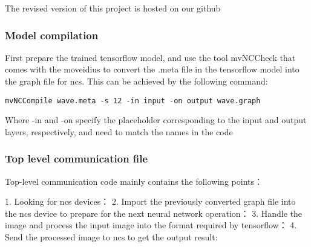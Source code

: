 The revised version of this project is hosted on our github\cite{my-fast-neural-sytle-tensorflow}
\subsubsection{Model compilation}
First prepare the trained tensorflow model, and use the tool mvNCCheck that comes with the moveidius to convert the .meta file in the tensorflow model into the graph file for ncs.
This can be achieved by the following command:
\begin{lstlisting}
mvNCCompile wave.meta -s 12 -in input -on output wave.graph
\end{lstlisting}
Where -in and -on specify the placeholder corresponding to the input and output layers, respectively, and need to match the names in the code
\subsubsection{Top level communication file}
 Top-level communication code mainly contains the following points：

1. Looking for ncs devices：
2. Import the previously converted graph file into the ncs device to prepare for the next neural network operation：
3. Handle the image and process the input image into the format required by tensorflow：
4. Send the processed image to ncs to get the output result:

